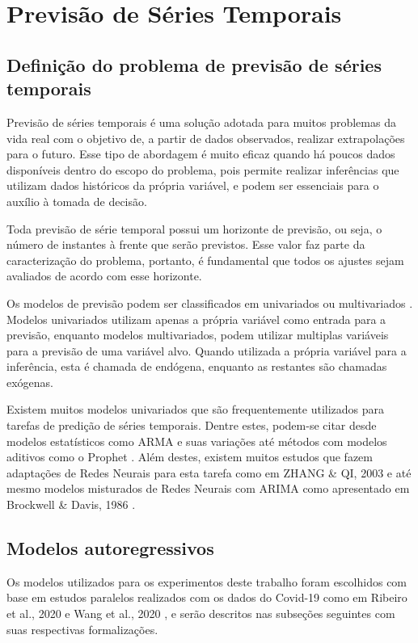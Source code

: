 \chapter{Previsão de Séries Temporais}

\section{Definição do problema de previsão de séries temporais}
Previsão de séries temporais é uma solução adotada para muitos problemas da vida real com o objetivo de, a partir de dados observados, realizar extrapolações para o futuro. Esse tipo de abordagem é muito eficaz quando há poucos dados disponíveis dentro do escopo do problema, pois permite realizar inferências que utilizam dados históricos da própria variável, e podem ser essenciais para o auxílio à tomada de decisão.

Toda previsão de série temporal possui um horizonte de previsão, ou seja, o número de instantes à frente que serão previstos. Esse valor faz parte da caracterização do problema, portanto, é fundamental que todos os ajustes sejam avaliados de acordo com esse horizonte.

Os modelos de previsão podem ser classificados em univariados ou multivariados \cite{box&jenkins}. Modelos univariados utilizam apenas a própria variável como entrada para a previsão, enquanto modelos multivariados, podem utilizar multiplas variáveis para a previsão de uma variável alvo. Quando utilizada a própria variável para a inferência, esta é chamada de endógena, enquanto as restantes são chamadas exógenas.

Existem muitos modelos univariados que são frequentemente utilizados para tarefas de predição de séries temporais. Dentre estes, podem-se citar desde modelos estatísticos como ARMA \cite{box&jenkins} e suas variações \cite{ALZAHRANI2020914} até métodos com modelos aditivos como o Prophet \cite{fbprophet}. Além destes, existem muitos estudos que fazem adaptações de Redes Neurais para esta tarefa como em ZHANG \& QI, 2003 \cite{ZHANG2005501} e até mesmo modelos misturados de Redes Neurais com ARIMA como apresentado em Brockwell \& Davis, 1986 \cite{ZHANG2003159}.

\section{Modelos autoregressivos}
Os modelos utilizados para os experimentos deste trabalho foram escolhidos com base em estudos paralelos realizados com os dados do Covid-19 como em Ribeiro et al., 2020 \cite{RIBEIRO2020109853} e Wang et al., 2020 \cite{WANG2020110058}, e serão descritos nas subseções seguintes com suas respectivas formalizações.
